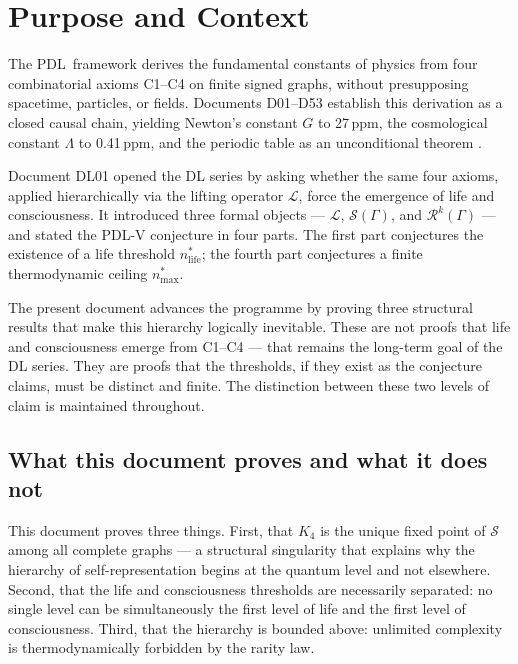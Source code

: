 \documentclass[12pt,a4paper]{article}
\theoremstyle{plain}
\theoremstyle{definition}
\theoremstyle{remark}
\newcommand{\PDL}{\textsc{PDL}}
\newcommand{\Kfour}{K_4}
\newcommand{\Sop}{\mathcal{S}}
\newcommand{\Rop}{\mathcal{R}}
\newcommand{\Lop}{\mathcal{L}}
\newcommand{\nlife}{n^{*}_{\mathrm{life}}}
\newcommand{\nmax}{n^{*}_{\mathrm{max}}}
\begin{document}
\clearpage

\tableofcontents
\newpage

\section{Purpose and Context}
\label{sec:context}

The \PDL\ framework derives the fundamental constants of physics from four
combinatorial axioms C1--C4 on finite signed graphs, without presupposing spacetime,
particles, or fields. Documents D01--D53 establish this derivation as a closed causal
chain, yielding Newton's constant $G$ to 27\,ppm, the cosmological constant $\Lambda$
to 0.41\,ppm, and the periodic table as an unconditional theorem \cite{DM_v18,DL01}.

Document DL01 opened the DL series by asking whether the same four axioms, applied
hierarchically via the lifting operator $\Lop$, force the emergence of life and
consciousness. It introduced three formal objects --- $\Lop$, $\Sop(\Gamma)$, and
$\Rop^k(\Gamma)$ --- and stated the \PDL-V conjecture in four parts. The first part
conjectures the existence of a life threshold $\nlife$; the fourth part conjectures
a finite thermodynamic ceiling $\nmax$.

The present document advances the programme by proving three structural results that
make this hierarchy logically inevitable. These are not proofs that life and
consciousness emerge from C1--C4 --- that remains the long-term goal of the DL
series. They are proofs that the thresholds, if they exist as the conjecture claims,
must be distinct and finite. The distinction between these two levels of claim is
maintained throughout.

\subsection{What this document proves and what it does not}

This document proves three things. First, that $\Kfour$ is the unique fixed point of
$\Sop$ among all complete graphs --- a structural singularity that explains why the
hierarchy of self-representation begins at the quantum level and not elsewhere.
Second, that the life and consciousness thresholds are necessarily separated: no
single level can be simultaneously the first level of life and the first level of
consciousness. Third, that the hierarchy is bounded above: unlimited complexity is
thermodynamically forbidden by the rarity law.
\end{document}
